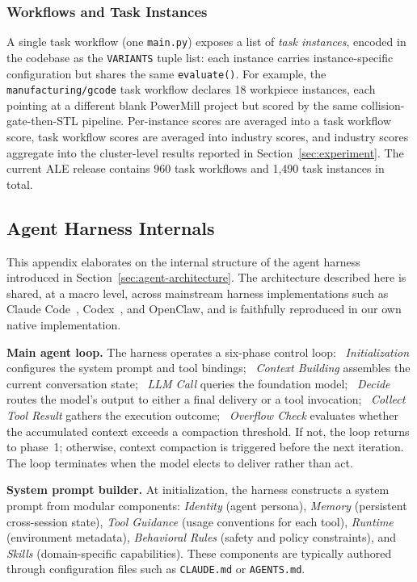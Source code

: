 \documentclass{llmxive}
\providecommand{\circled}[1]{\tikz[baseline=(char.base)]{\node[shape=circle,draw,inner sep=1pt,minimum size=12pt,font=\scriptsize] (char) {#1};}}
\providecommand{\totaltasks}{960}
\providecommand{\totalvariants}{1{,}490}
\begin{document}
\subsubsection{Workflows and Task Instances}
\label{app:eval-variants}

A single task workflow (one \texttt{main.py}) exposes a list of \emph{task instances}, encoded in the codebase as the \texttt{VARIANTS} tuple list: each instance carries instance-specific configuration but shares the same \texttt{evaluate()}. For example, the \texttt{manufacturing/gcode} task workflow declares 18 workpiece instances, each pointing at a different blank PowerMill project but scored by the same collision-gate-then-STL pipeline. Per-instance scores are averaged into a task workflow score, task workflow scores are averaged into industry scores, and industry scores aggregate into the cluster-level results reported in Section~\ref{sec:experiment}. The current ALE release contains \totaltasks{} task workflows and \totalvariants{} task instances in total.

\subsection{Agent Harness Internals}
\label{app:agent-harness}

This appendix elaborates on the internal structure of the agent harness introduced in Section~\ref{sec:agent-architecture}. The architecture described here is shared, at a macro level, across mainstream harness implementations such as Claude Code~\citep{anthropic2025claudecode}, Codex~\citep{openai2025codex}, and OpenClaw, and is faithfully reproduced in our own native implementation.

\noindent \textbf{Main agent loop.}
The harness operates a six-phase control loop: \circled{0}~\emph{Initialization} configures the system prompt and tool bindings; \circled{1}~\emph{Context Building} assembles the current conversation state; \circled{2}~\emph{LLM Call} queries the foundation model; \circled{3}~\emph{Decide} routes the model's output to either a final delivery or a tool invocation; \circled{4}~\emph{Collect Tool Result} gathers the execution outcome; \circled{5}~\emph{Overflow Check} evaluates whether the accumulated context exceeds a compaction threshold. If not, the loop returns to phase~1; otherwise, context compaction is triggered before the next iteration. The loop terminates when the model elects to deliver rather than act.

\noindent \textbf{System prompt builder.}
At initialization, the harness constructs a system prompt from modular components: \emph{Identity} (agent persona), \emph{Memory} (persistent cross-session state), \emph{Tool Guidance} (usage conventions for each tool), \emph{Runtime} (environment metadata), \emph{Behavioral Rules} (safety and policy constraints), and \emph{Skills} (domain-specific capabilities). These components are typically authored through configuration files such as \texttt{CLAUDE.md} or \texttt{AGENTS.md}.
\end{document}

